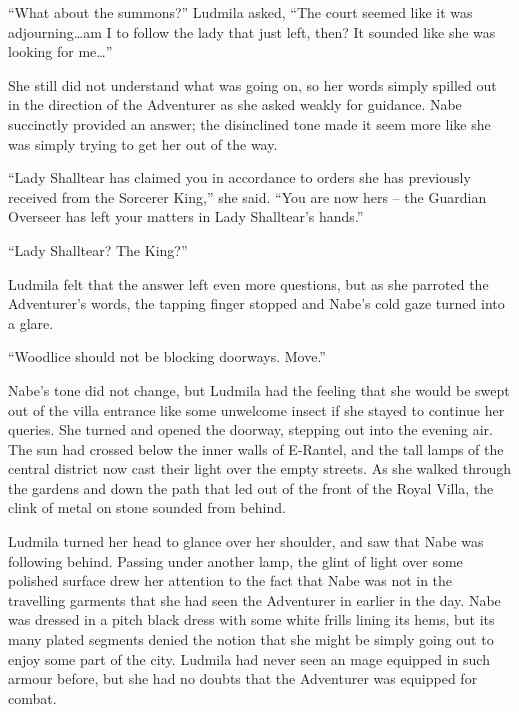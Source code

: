  

“What about the summons?” Ludmila asked, “The court seemed like it was adjourning…am I to follow the lady that just left, then? It sounded like she was looking for me…”

 

She still did not understand what was going on, so her words simply spilled out in the direction of the Adventurer as she asked weakly for guidance. Nabe succinctly provided an answer; the disinclined tone made it seem more like she was simply trying to get her out of the way.

 

“Lady Shalltear has claimed you in accordance to orders she has previously received from the Sorcerer King,” she said. “You are now hers – the Guardian Overseer has left your matters in Lady Shalltear’s hands.”

 

“Lady Shalltear? The King?”

 

Ludmila felt that the answer left even more questions, but as she parroted the Adventurer’s words, the tapping finger stopped and Nabe’s cold gaze turned into a glare.

 

“Woodlice should not be blocking doorways. Move.”

 

Nabe’s tone did not change, but Ludmila had the feeling that she would be swept out of the villa entrance like some unwelcome insect if she stayed to continue her queries. She turned and opened the doorway, stepping out into the evening air. The sun had crossed below the inner walls of E-Rantel, and the tall lamps of the central district now cast their light over the empty streets. As she walked through the gardens and down the path that led out of the front of the Royal Villa, the clink of metal on stone sounded from behind.

 

Ludmila turned her head to glance over her shoulder, and saw that Nabe was following behind. Passing under another lamp, the glint of light over some polished surface drew her attention to the fact that Nabe was not in the travelling garments that she had seen the Adventurer in earlier in the day. Nabe was dressed in a pitch black dress with some white frills lining its hems, but its many plated segments denied the notion that she might be simply going out to enjoy some part of the city. Ludmila had never seen an mage equipped in such armour before, but she had no doubts that the Adventurer was equipped for combat.

